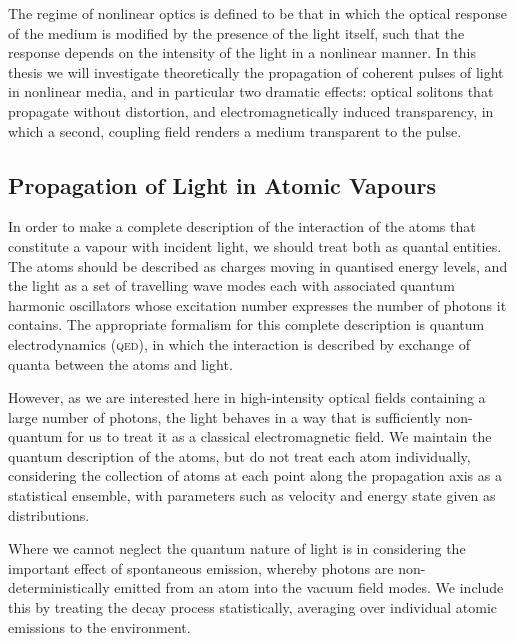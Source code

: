     The regime of nonlinear optics is defined to be that in which the optical
    response of the medium is modified by the presence of the light itself, such
    that the response depends on the intensity of the light in a nonlinear
    manner.\cite{boyd2008nonlinear} In this thesis we will investigate theoretically the
    propagation of coherent pulses of light in nonlinear media, and in
    particular two dramatic effects: optical solitons that propagate without
    distortion, and electromagnetically induced transparency, in which a second,
    coupling field renders a medium transparent to the pulse.

  \subsection*{Propagation of Light in Atomic Vapours}

    In order to make a complete description of the interaction of the atoms that
    constitute a vapour with incident light, we should treat both as quantal
    entities. The atoms should be described as charges moving in quantised
    energy levels, and the light as a set of travelling wave modes each with
    associated quantum harmonic oscillators whose excitation number expresses
    the number of photons it contains.\cite{scully1997quantum} The appropriate formalism
    for this complete description is quantum electrodynamics (\textsc{qed}), in
    which the interaction is described by exchange of quanta between the atoms
    and light.

    However, as we are interested here in high-intensity optical fields
    containing a large number of photons, the light behaves in a way that is
    sufficiently non-quantum for us to treat it as a classical electromagnetic
    field.\cite{jackson1998classical} We maintain the quantum description of the atoms, but do
    not treat each atom individually, considering the collection of atoms at
    each point along the propagation axis as a statistical ensemble, with
    parameters such as velocity and energy state given as distributions.

    Where we cannot neglect the quantum nature of light is in considering the
    important effect of spontaneous emission, whereby photons are non-
    deterministically emitted from an atom into the vacuum field modes. We
    include this by treating the decay process statistically, averaging over
    individual atomic emissions to the environment.\cite{loudon2000quantum}

